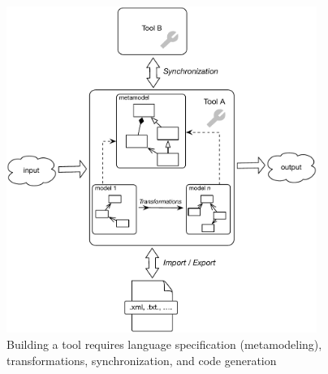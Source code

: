 \begin{figure}[htbp]
	\centering
  \includegraphics[width=0.9\textwidth]{../../org.moflon.doc.handbook.00_introduction/introduction_images/eMoflonDiagram.pdf}
	\caption{Building a tool requires language specification (metamodeling), transformations, synchronization, and code generation}
	\label{fig:transformationModel}
\end{figure}
